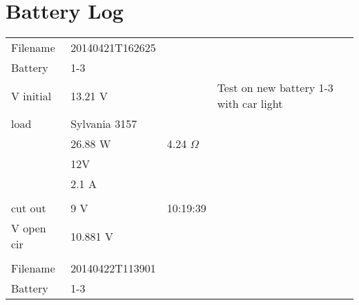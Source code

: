 \section{Battery Log}
\label{app:BatteryLog}
\begin{table}[h]
\centering
\begin{tabular}{lllp{2.5cm}}
Filename   & 20140421T162625                &          &                                                                               \\
Battery    & 1-3                            &          &                                                                               \\
V initial  & 13.21 V                        &          & Test on new battery 1-3 with car light                                        \\
load       & Sylvania 3157                  &          &                                                                               \\
           & 26.88 W                        & 4.24 $\Omega$   &                                                                               \\
           & 12V                            &          &                                                                               \\
           & 2.1 A                          &          &                                                                               \\
           &                                &          &                                                                               \\
cut out    & 9 V                            & 10:19:39 &                                                                               \\
V open cir & 10.881 V                       &          &                                                                               \\
           &                                &          &                                                                               \\
\hline
Filename   & 20140422T113901                &          &                                                                               \\
Battery    & 1-3                            &          &                                                                               \\

\end{tabular}
\end{table}
